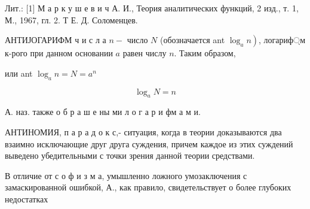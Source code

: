 \documentclass[10pt]{article}
\begin{document}
Лит.: [1] М а р к у ш е в и ч А. И., Теория аналитических функций, 2 изд., т. 1, М., 1967, гл. 2. Т Е. Д. Соломенцев.



АНТИЈОГАРИФМ ч и с л а $n-$ число $N$ (обозначается ant $\left.\log _{a} n\right)$, логариф্м к-рого при данном основании $a$ равен числу $n$. Таким образом,



или ant $\log _{a} n=N=a^{n}$



\[

\log _{a} N=n

\]



А. наз. также о б р а ш е ны ми л о г а р и фм а м и.



АНТИНОМИЯ, п а р а д о к с,- ситуация, когда в теории доказываются два взаимно исключающие друг друга суждения, причем каждое из этих суждений выведено убедительными с точки зрения данной теории средствами.



В отличие от с о ф и з м а, умышленно ложного умозаключения с замаскированной ошибкой, А., как правило, свидетельствует о более глубоких недостатках
\end{document}
